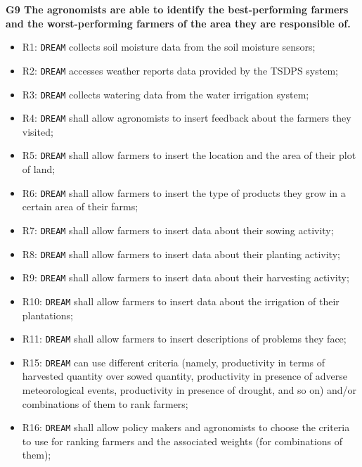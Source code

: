 \documentclass{article}
\begin{document}
\vspace{5mm}
\textbf{G9 The agronomists are able to identify the best-performing farmers and the worst-performing farmers of the area they are responsible of.}
\begin{itemize}
    \item R1: \verb|DREAM| collects soil moisture data from the soil moisture sensors;
    \item R2: \verb|DREAM| accesses weather reports data provided by the TSDPS system;

    \item R3: \verb|DREAM| collects watering data from the water irrigation system;

    \item R4: \verb|DREAM| shall allow agronomists to insert feedback about the farmers they visited;

    \item R5: \verb|DREAM| shall allow farmers to insert the location and the area of their plot of land;

    \item R6: \verb|DREAM| shall allow farmers to insert the type of products they grow in a certain area of their farms;

    \item R7: \verb|DREAM| shall allow farmers to insert data about their sowing activity;

    \item R8: \verb|DREAM| shall allow farmers to insert data about their planting activity;
    
    \item R9: \verb|DREAM| shall allow farmers to insert data about their harvesting activity;
    
    \item R10: \verb|DREAM| shall allow farmers to insert data about the irrigation of their plantations;
    
    \item R11: \verb|DREAM| shall allow farmers to insert descriptions of problems they face;
    
    \item R15: \verb|DREAM| can use different criteria (namely, productivity in terms of harvested quantity over sowed quantity, productivity in presence of adverse meteorological events, productivity in presence of drought, and so on) and/or combinations of them to rank farmers;
    
    \item R16: \verb|DREAM| shall allow policy makers and agronomists to choose the criteria to use for ranking farmers and the associated weights (for combinations of them);
    

\end{itemize}
\end{document}
